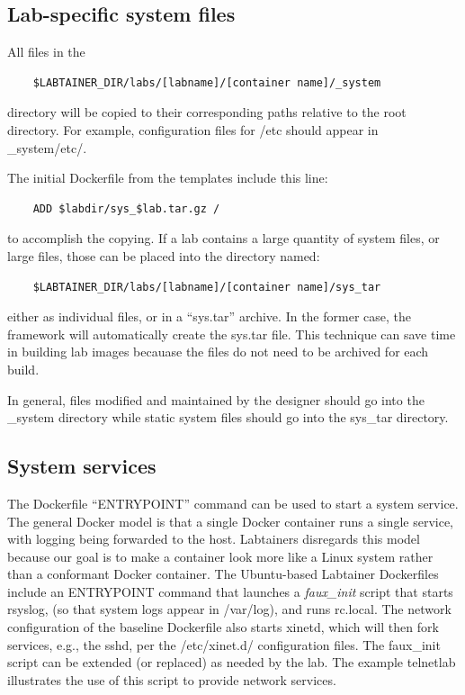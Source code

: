 \documentclass[12pt]{article}
\begin{document}
\subsection{Lab-specific system files}
All files in the
\begin{verbatim}
    $LABTAINER_DIR/labs/[labname]/[container name]/_system
\end{verbatim}
directory will be copied to their corresponding paths relative to the root directory.
For example, configuration files for /etc should appear in \_system/etc/.

The initial Dockerfile from the templates include this line:
\begin{verbatim}
    ADD $labdir/sys_$lab.tar.gz /
\end{verbatim}
\noindent to accomplish the copying. 
If a lab contains a large quantity of system files, or large files, those
can be placed into the directory named:
\begin{verbatim}
    $LABTAINER_DIR/labs/[labname]/[container name]/sys_tar
\end{verbatim}
either as individual files, or in a ``sys.tar'' archive.  In the former case,
the framework will automatically create the sys.tar file.  This technique 
can save time in building lab images becauase the files do not need to be 
archived for each build.  

In general, files modified and maintained by the designer should go into the
\_system directory while static system files should go into the sys\_tar directory.

\subsection {System services}
The Dockerfile ``ENTRYPOINT'' command can be used to start a system service.  The general Docker 
model is that a single Docker container runs a single service, with logging being forwarded to 
the host.  Labtainers disregards this model because our goal is to make a container look more like a Linux
system rather than a conformant Docker container.  The Ubuntu-based Labtainer Dockerfiles include an
ENTRYPOINT command that launches a \textit{faux\_init} script that starts rsyslog, (so that system logs
appear in /var/log), and runs rc.local.  The network configuration of the baseline Dockerfile also starts xinetd,
which will then fork services, e.g., the sshd, per the /etc/xinet.d/ configuration files.  The faux\_init script
can be extended (or replaced) as needed by the lab.  The example telnetlab illustrates the use of this script
to provide network services.
\end{document}

